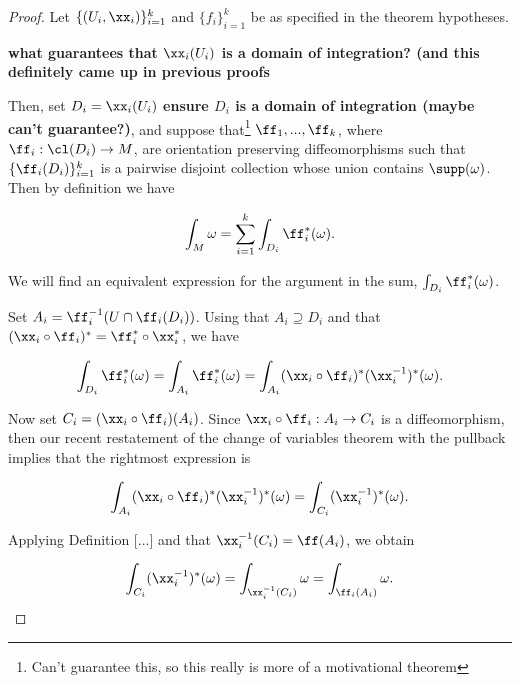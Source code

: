 \begin{proof}
    Let $\{(U_i, \xx_i)\}_{i = 1}^k$ and $\{f_i\}_{i = 1 }^k$ be as specified in the theorem hypotheses.
    
    \textbf{what guarantees that $\xx_i(U_i)$ is a domain of integration? (and this definitely came up in previous proofs}
    
    Then, set $D_i = \xx_i(U_i)$ \textbf{ensure $D_i$ is a domain of integration (maybe can't guarantee?)}, and suppose that\footnote{Can't guarantee this, so this really is more of a motivational theorem} $\ff_1, ..., \ff_k$, where $\ff_i:\cl(D_i) \rightarrow M$, are orientation preserving diffeomorphisms such that $\{\ff_i(D_i)\}_{i = 1}^k$ is a pairwise disjoint collection whose union contains $\supp(\omega)$. Then by definition we have
    
    \begin{align*}
        \int_M \omega = \sum_{i = 1}^k \int_{D_i} \ff_i^*(\omega).
    \end{align*}
    
    We will find an equivalent expression for the argument in the sum, $\int_{D_i} \ff_i^*(\omega)$.
    
    Set $A_i = \ff_i^{-1}(U \cap \ff_i(D_i))$. Using that $A_i \supseteq D_i$ and that $(\xx_i \circ \ff_i)^* = \ff_i^* \circ \xx_i^*$, we have
    
    \begin{align*}
        \int_{D_i} \ff_i^*(\omega) = \int_{A_i} \ff_i^*(\omega) = \int_{A_i} (\xx_i \circ \ff_i)^* (\xx_i^{-1})^* (\omega).
    \end{align*}
    
    Now set $C_i = (\xx_i \circ \ff_i)(A_i)$. Since $\xx_i \circ \ff_i:A_i \rightarrow C_i$ is a diffeomorphism, then our recent restatement of the change of variables theorem with the pullback implies that the rightmost expression is
    
    \begin{align*}
        \int_{A_i} (\xx_i \circ \ff_i)^* (\xx_i^{-1})^* (\omega) = \int_{C_i} (\xx_i^{-1})^* (\omega).
    \end{align*}
    
    Applying Definition [...] and that $\xx_i^{-1}(C_i) = \ff(A_i)$, we obtain
    
    \begin{align*}
        \int_{C_i} (\xx_i^{-1})^* (\omega) = \int_{\xx_i^{-1}(C_i)} \omega = \int_{\ff_i(A_i)} \omega.
    \end{align*}


\end{proof}
